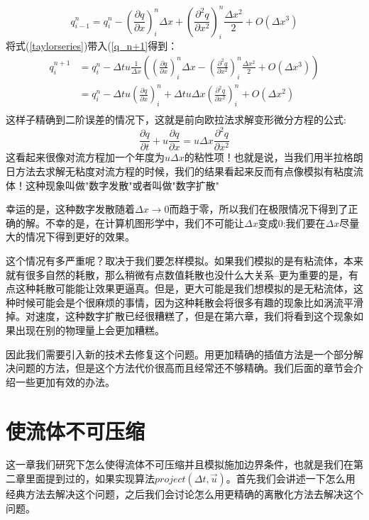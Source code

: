 \documentclass{article}
\begin{document}
\begin{equation}
q^n_{i-1}=q_i^n-\left (\frac{\partial{q}}{\partial{x}}\right)^n_i\Delta{x}+\left(\frac{\partial^2{q}}{\partial{x}^2}\right)^n_i\frac{\Delta{x}^2}{2}+O(\Delta{x}^3) \label{taylorseries}
\end{equation}
将式(\ref{taylorseries})带入(\ref{q_n+1}得到：
\begin{equation}
\begin{aligned}
q_i^{n+1}&=q_i^n-\Delta{t}u\frac{1}{\Delta{x}}\left(\left(\frac{\partial{q}}{\partial{x}}\right)^n_i\Delta{x}-\left(\frac{\partial^2{q}}{\partial{x}^2}\right)^n_i\frac{\Delta{x}^2}{2}+O(\Delta{x^3})\right) \\
&=q_i^n-\Delta{t}u\left(\frac{\partial{q}}{\partial{x}}\right)^n_i+\Delta{t}u\Delta{x}\left(\frac{\partial^2{q}}{\partial{x}^2}\right)^n_i+O(\Delta{x}^2) \\
\end{aligned}
\end{equation}
这样子精确到二阶误差的情况下，这就是前向欧拉法求解变形微分方程的公式:
\begin{equation}
\frac{\partial{q}}{\partial{t}}+u\frac{\partial{q}}{\partial{x}}=u\Delta{x}\frac{\partial^2{q}}{\partial{x}^2}
\end{equation}
这看起来很像对流方程加一个年度为$u\Delta{x}$的粘性项！也就是说，当我们用半拉格朗日方法去求解无粘度对流方程的时候，我们的结果看起来反而有点像模拟有粘度流体！这种现象叫做"数字发散"或者叫做"数字扩散"
\par
幸运的是，这种数字发散随着$\Delta{x}\to{0}$而趋于零，所以我们在极限情况下得到了正确的解。不幸的是，在计算机图形学中，我们不可能让$\Delta{x}$变成0:我们要在$\Delta{x}$尽量大的情况下得到更好的效果。
\par
这个情况有多严重呢？取决于我们要怎样模拟。如果我们模拟的是有粘流体，本来就有很多自然的耗散，那么稍微有点数值耗散也没什么大关系--更为重要的是，有点这种耗散可能能让效果更逼真。但是，更大可能是我们想模拟的是无粘流体，这种时候可能会是个很麻烦的事情，因为这种耗散会将很多有趣的现象比如涡流平滑掉。对速度，这种数字扩散已经很糟糕了，但是在第六章，我们将看到这个现象如果出现在别的物理量上会更加糟糕。
\par
因此我们需要引入新的技术去修复这个问题。用更加精确的插值方法是一个部分解决问题的方法，但是这个方法代价很高而且经常还不够精确。我们后面的章节会介绍一些更加有效的办法。
\section{使流体不可压缩}
这一章我们研究下怎么使得流体不可压缩并且模拟施加边界条件，也就是我们在第二章里面提到过的，如果实现算法$project(\Delta t,\vec{u})$。首先我们会讲述一下怎么用经典方法去解决这个问题，之后我们会讨论怎么用更精确的离散化方法去解决这个问题。
\par
\end{document}
